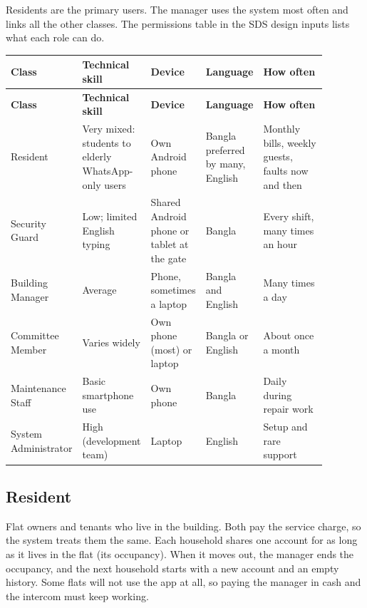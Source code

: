 \documentclass[11pt,a4paper]{report}
\begin{document}
Residents are the primary users. The manager uses the system most often and links all the other classes. The permissions table in the SDS design inputs lists what each role can do.

{\small\setlength{\LTpre}{6pt}\setlength{\LTpost}{6pt}
\begin{longtable}{>{\raggedright\arraybackslash}p{0.141\linewidth}>{\raggedright\arraybackslash}p{0.206\linewidth}>{\raggedright\arraybackslash}p{0.175\linewidth}>{\raggedright\arraybackslash}p{0.135\linewidth}>{\raggedright\arraybackslash}p{0.218\linewidth}}
\toprule
\textbf{Class} & \textbf{Technical skill} & \textbf{Device} & \textbf{Language} & \textbf{How often} \\
\midrule
\endfirsthead
\toprule
\textbf{Class} & \textbf{Technical skill} & \textbf{Device} & \textbf{Language} & \textbf{How often} \\
\midrule
\endhead
\bottomrule
\endlastfoot
Resident & Very mixed: students to elderly WhatsApp-only users & Own Android phone & Bangla preferred by many, English & Monthly bills, weekly guests, faults now and then \\
Security Guard & Low; limited English typing & Shared Android phone or tablet at the gate & Bangla & Every shift, many times an hour \\
Building Manager & Average & Phone, sometimes a laptop & Bangla and English & Many times a day \\
Committee Member & Varies widely & Own phone (most) or laptop & Bangla or English & About once a month \\
Maintenance Staff & Basic smartphone use & Own phone & Bangla & Daily during repair work \\
System Administrator & High (development team) & Laptop & English & Setup and rare support \\
\end{longtable}
}

\subsection{Resident}

Flat owners and tenants who live in the building. Both pay the service charge, so the system treats them the same. Each household shares one account for as long as it lives in the flat (its occupancy). When it moves out, the manager ends the occupancy, and the next household starts with a new account and an empty history. Some flats will not use the app at all, so paying the manager in cash and the intercom must keep working.
\end{document}
